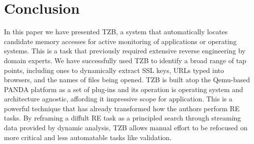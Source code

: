 \section{Conclusion}
\label{sec:conclusion}

In this paper we have presented TZB, a system that automatically locates 
candidate memory accesses for active monitoring of applications or operating
systems.  
This is a task that previously required extensive reverse engineering by domain
experts.  
We have successfully used TZB to identify a broad range of tap points, including 
ones to dynamically extract SSL keys, URLs typed into browsers, and the names of 
files being opened.
TZB is built atop the Qemu-based PANDA platform as a set of plug-ins and its 
operation is operating system and architecture agnostic, affording it impressive 
scope for application.
This is a powerful technique that has already transformed how the authors 
perform RE tasks.
By reframing a diffult RE task as a principled search through streaming data 
provided by dynamic analysis, TZB allows manual effort to be refocused on 
more critical and less automatable tasks like validation.

